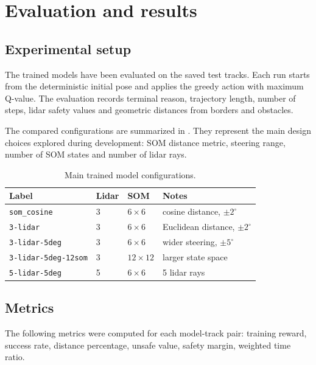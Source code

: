 \section{Evaluation and results}
\label{ch:evaluation}

\subsection{Experimental setup}

The trained models have been evaluated on the saved test tracks. Each run starts from the deterministic initial pose and applies the greedy action with maximum Q-value. The evaluation records terminal reason, trajectory length, number of steps, lidar safety values and geometric distances from borders and obstacles.

The compared configurations are summarized in . They represent the main design choices explored during development: SOM distance metric, steering range, number of SOM states and number of lidar rays.

\begin{table}[H]
    \centering
    \caption{Main trained model configurations.}
    \label{tab:model-configurations}
    \small
    \begin{tabular}{llll}
        \toprule
        Label & Lidar & SOM & Notes \\
        \midrule
        \texttt{som\_cosine} & 3 & $6 \times 6$ & cosine distance, $\pm 2^\circ$ \\
        \texttt{3-lidar} & 3 & $6 \times 6$ & Euclidean distance, $\pm 2^\circ$ \\
        \texttt{3-lidar-5deg} & 3 & $6 \times 6$ & wider steering, $\pm 5^\circ$ \\
        \texttt{3-lidar-5deg-12som} & 3 & $12 \times 12$ & larger state space \\
        \texttt{5-lidar-5deg} & 5 & $6 \times 6$ & 5 lidar rays \\
        \bottomrule
    \end{tabular}
\end{table}

\subsection{Metrics}

The following metrics were computed for each model-track pair: training reward, success rate, distance percentage, unsafe value, safety margin, weighted time ratio.


